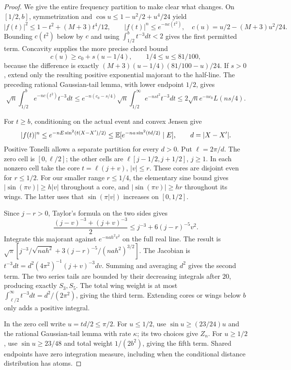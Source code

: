 \begin{proof}
We give the entire frequency partition to make clear what changes.
On $[1/2,b]$, symmetrization and
$\cos u\le1-u^2/2+u^4/24$ yield
\[
 |f(t)|^2\le1-t^2+(M+3)t^4/12,
 \qquad |f(t)|^n\le e^{-n c(t^2)},
 \quad c(u)=u/2-(M+3)u^2/24.
\]
Bounding $c(t^2)$ below by $c$ and using
$\int_{1/2}^{b}t^{-3}dt<2$ gives the first permitted term.
Concavity supplies the more precise chord bound
\[
 c(u)\ge c_0+s(u-1/4),\qquad 1/4\le u\le81/100,
\]
because the difference is exactly
$(M+3)(u-1/4)(81/100-u)/24$. If $s>0$, extend only the resulting
positive exponential majorant to the half-line. The preceding rational
Gaussian-tail lemma, with lower endpoint $1/2$, gives
\[
 \sqrt n\int_{1/2}^{b}e^{-nc(t^2)}t^{-3}dt
 \le e^{-n(c_0-s/4)}\sqrt n
       \int_{1/2}^{\infty}e^{-ns t^2}t^{-3}dt
 \le2\sqrt n e^{-nc_0}L(ns/4).
\]

For $t\ge b$, conditioning on the actual event and convex Jensen give
\[
 |f(t)|^n\le e^{-nE\sin^2(t(X-X')/2)}
 \le \mathbb E[e^{-na\sin^2(td/2)}\mid E],\qquad d=|X-X'|.
\]
Positive Tonelli allows a separate partition for every $d>0$.
Put $\ell=2\pi/d$. The zero cell is $[0,\ell/2]$; the other cells are
$\ell[j-1/2,j+1/2]$, $j\ge1$. In each nonzero cell take the core
$t=\ell(j+v)$, $|v|\le r$. These cores are disjoint even for $r\le1/2$.
For our smaller range $r\le1/4$, the elementary sine bound gives
$|\sin(\pi v)|\ge h|v|$ throughout a core, and
$|\sin(\pi v)|\ge hr$ throughout its wings. The latter uses that
$\sin(\pi|v|)$ increases on $[0,1/2]$.

Since $j-r>0$, Taylor's formula on the two sides gives
\[
 \frac{(j-v)^{-3}+(j+v)^{-3}}2
 \le j^{-3}+6(j-r)^{-5}v^2.
\]
Integrate this majorant against $e^{-nah^2v^2}$ on the full real line.
The result is
$\sqrt\pi[j^{-3}/\sqrt{nah^2}
  +3(j-r)^{-5}/(nah^2)^{3/2}]$.
The Jacobian is
$t^{-3}dt=d^2(4\pi^2)^{-1}(j+v)^{-3}dv$.
Summing and averaging $d^2$ gives the second term. The two series tails
are bounded by their decreasing integrals after $20$, producing exactly
$S_3,S_5$. The total wing weight is at most
$\int_{\ell/2}^{\infty}t^{-3}dt=d^2/(2\pi^2)$, giving the third term.
Extending cores or wings below $b$ only adds a positive integral.

In the zero cell write $u=td/2\le\pi/2$.
For $u\le1/2$, use $\sin u\ge(23/24)u$ and the rational
Gaussian-tail lemma with rate $\kappa$; its two choices give $Z_n$.
For $u\ge1/2$, use $\sin u\ge23/48$ and total weight
$1/(2b^2)$, giving the fifth term. Shared endpoints have zero integration
measure, including when the conditional distance distribution has atoms.


\end{proof}
